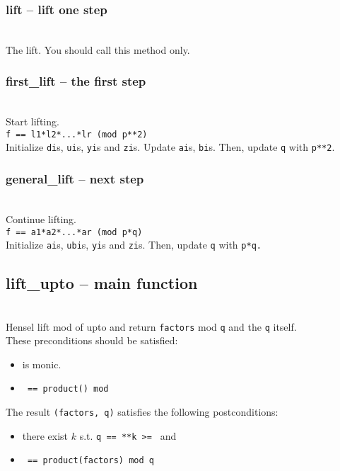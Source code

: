   \subsubsection{lift -- lift one step}
  \\
  \spacing
  The lift. You should call this method only.
  \subsubsection{first\_lift -- the first step}
  \\
  \spacing
  \quad Start lifting.\\
  {\tt f == l1*l2*...*lr (mod p**2)}\\
  Initialize {\tt di}s, {\tt ui}s, {\tt yi}s and {\tt zi}s.
  Update {\tt ai}s, {\tt bi}s.
  Then, update {\tt q} with {\tt p**2}.
  \subsubsection{general\_lift -- next step}
  \\
  \spacing
  \quad Continue lifting.\\
  {\tt f == a1*a2*...*ar (mod p*q)}\\
  Initialize {\tt ai}s, {\tt ubi}s, {\tt yi}s and {\tt zi}s.
  Then, update {\tt q} with {\tt p*q.}

  \subsection{lift\_upto -- main function}
  \\
\spacing
\quad Hensel lift  mod  of  upto 
and return {\tt factors} mod {\tt q} and the {\tt q} itself.\\
\quad These preconditions should be satisfied:
\begin{itemize}
\item {} is monic.
\item {\tt {} == product() mod }
\end{itemize}
\quad The result {\tt (factors, q)} satisfies the following postconditions:
\begin{itemize}
\item there exist \(k\) s.t. {\tt q == **k >= } and
\item {\tt {} == product(factors) mod q}
\end{itemize}

\C



